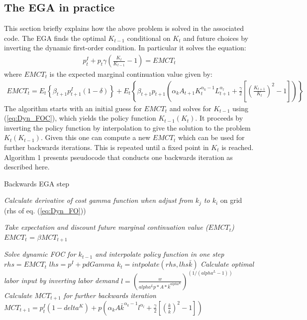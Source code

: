 \documentclass[danish]{article}
\begin{document}
\subsection{The EGA in practice} 
This section briefly explains how the above problem is solved in the associated code. The EGA finds the optimal $K_{t-1}$ conditional on $K_t$ and future choices by inverting the dynamic first-order condition. In particular it solves the equation:
\begin{gather}
    p_{t}^{I}+p_{t}\gamma\left(\frac{K_{t}}{K_{t-1}}-1\right)= EMCT_{t}  \label{eq:Dyn_FOC}
\end{gather}
where $EMCT_{t}$ is the expected marginal continuation value given by:
\begin{gather*}
EMCT_{t}=E_{t}\left\{ \beta_{t+1}p_{t+1}^{I}\left(1-\delta\right)\right\} +E_{t}\left\{ \beta_{t+1}p_{t+1}\left(\alpha_{k}A_{t+1}K_{t}^{\alpha_{k}-1}L_{t+1}^{\alpha_{l}}+\frac{\gamma}{2}\left[\left(\frac{K_{t+1}}{K_{t}}\right)^{2}-1\right]\right)\right\} 
\end{gather*}
The algorithm starts with an initial guess for $EMCT_{t}$ and solves for $K_{t-1}$ using (\ref{eq:Dyn_FOC}), which yields the policy function $K_{t-1}(K_t)$. 
It proceeds by inverting the policy function by interpolation to give the solution to the problem $K_t(K_{t-1})$. Given this one can compute a new $EMCT_{t}$ which can be used for further backwards iterations. This is repeated until a fixed point in $K_t$ is reached. Algorithm 1 presents pseudocode that conducts one backwards iteration as described here.  


\begin{algorithm} 
  \caption{Backwards EGA step}
 \nl \textit{Calculate derivative of cost gamma function when adjust from $k_j$ to $k_i$} on grid (rhs of eq. (\ref{eq:Dyn_FO}))\;
 \nl  {}
  
 \nl  \textit{Take expectation and discount future marginal continuation value ($EMCT_{t}$)} \;
 \nl  \quad $EMCT_{t}$ = $\beta MCT_{t+1}$ \;

 \nl \textit{Solve dynamic FOC for $k_{t-1}$ and interpolate policy function in one step}\;
 \nl   \quad    $rhs = EMCT_{t}$ \;
 \nl   \quad    $lhs = p^I + p dGamma$ \;
 \nl   \qua     $k_t = intpolate(rhs, lhs \bar{k})$ \;
 \nl  \textit{Calculate optimal labor input by inverting labor demand} \;
 \nl   \quad    $l = (\frac{w}{alpha^L p* A * \bar{k}^{alpha^K}})^{(1/({alpha^L}-1))}$ \;
 \nl  \textit{Calculate $MCT_{t+1}$ for further backwards iteration} \;
 \nl   \quad $MCT_{t+1} = p^I_t  (1-delta^K) + p\left(\alpha_{k}A\bar{k}^{\alpha_{k}-1} l^{\alpha_{l}}+\frac{\gamma}{2}\left[\left(\frac{k}{\bar{k}}\right)^{2}-1\right]\right)$  \; 

\end{algorithm}
\end{document}
